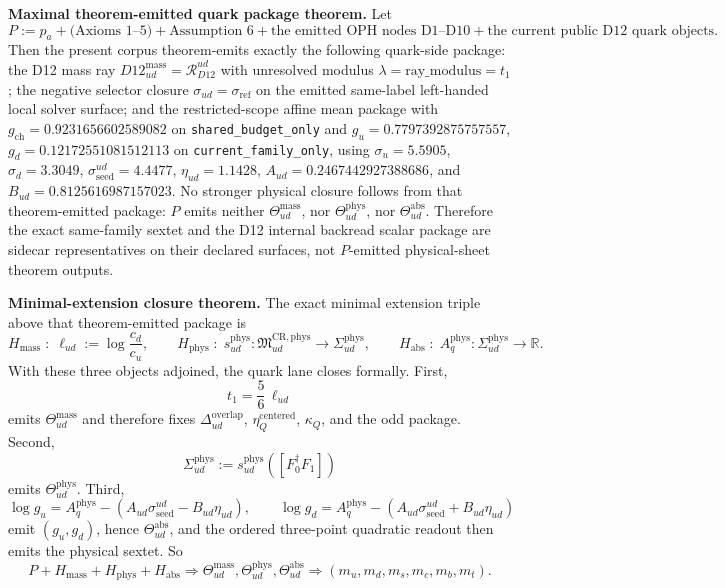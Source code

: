 \textbf{Maximal theorem-emitted quark package theorem.} Let
\[
P:=p_a+\text{(Axioms 1--5)}+\text{Assumption 6}
+\text{the emitted OPH nodes D1--D10}
+\text{the current public D12 quark objects}.
\]
Then the present corpus theorem-emits exactly the following quark-side package: the D12 mass ray \(D12_{ud}^{\mathrm{mass}}=\mathcal R_{D12}^{ud}\) with unresolved modulus \(\lambda=\mathrm{ray\_modulus}=t_1\); the negative selector closure \(\sigma_{ud}=\sigma_{\mathrm{ref}}\) on the emitted same-label left-handed local solver surface; and the restricted-scope affine mean package with \(g_{\mathrm{ch}}=0.9231656602589082\) on \texttt{shared\_budget\_only} and \(g_u=0.7797392875757557\), \(g_d=0.12172551081512113\) on \texttt{current\_family\_only}, using \(\sigma_u=5.5905\), \(\sigma_d=3.3049\), \(\sigma_{\mathrm{seed}}^{ud}=4.4477\), \(\eta_{ud}=1.1428\), \(A_{ud}=0.2467442927388686\), and \(B_{ud}=0.8125616987157023\). No stronger physical closure follows from that theorem-emitted package: \(P\) emits neither \(\Theta_{ud}^{\mathrm{mass}}\), nor \(\Theta_{ud}^{\mathrm{phys}}\), nor \(\Theta_{ud}^{\mathrm{abs}}\). Therefore the exact same-family sextet and the D12 internal backread scalar package are sidecar representatives on their declared surfaces, not \(P\)-emitted physical-sheet theorem outputs.

\textbf{Minimal-extension closure theorem.} The exact minimal extension triple above that theorem-emitted package is
\[
H_{\mathrm{mass}}
\;:\;
\ell_{ud}:=\log\frac{c_d}{c_u},
\qquad
H_{\mathrm{phys}}
\;:\;
s_{ud}^{\mathrm{phys}}:\mathfrak M_{ud}^{\mathrm{CR,phys}}\to\Sigma_{ud}^{\mathrm{phys}},
\qquad
H_{\mathrm{abs}}
\;:\;
A_q^{\mathrm{phys}}:\Sigma_{ud}^{\mathrm{phys}}\to\mathbb R.
\]
With these three objects adjoined, the quark lane closes formally. First,
\[
t_1=\frac56\,\ell_{ud}
\]
emits \(\Theta_{ud}^{\mathrm{mass}}\) and therefore fixes \(\Delta_{ud}^{\mathrm{overlap}}\), \(\eta_Q^{\mathrm{centered}}\), \(\kappa_Q\), and the odd package. Second,
\[
\Sigma_{ud}^{\mathrm{phys}}
:=
s_{ud}^{\mathrm{phys}}([F_0^\dagger F_1])
\]
emits \(\Theta_{ud}^{\mathrm{phys}}\). Third,
\[
\log g_u
=
A_q^{\mathrm{phys}}-(A_{ud}\sigma_{\mathrm{seed}}^{ud}-B_{ud}\eta_{ud}),
\qquad
\log g_d
=
A_q^{\mathrm{phys}}-(A_{ud}\sigma_{\mathrm{seed}}^{ud}+B_{ud}\eta_{ud})
\]
emit \((g_u,g_d)\), hence \(\Theta_{ud}^{\mathrm{abs}}\), and the ordered three-point quadratic readout then emits the physical sextet. So
\[
P+H_{\mathrm{mass}}+H_{\mathrm{phys}}+H_{\mathrm{abs}}
\Longrightarrow
\Theta_{ud}^{\mathrm{mass}},\Theta_{ud}^{\mathrm{phys}},\Theta_{ud}^{\mathrm{abs}}
\Longrightarrow
(m_u,m_d,m_s,m_c,m_b,m_t).
\]

